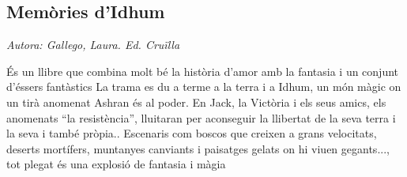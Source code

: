 \begin{news}


\subsection*{Memòries d’Idhum}

\emph{Autora: Gallego, Laura. Ed. Cruïlla}

És un llibre que combina molt bé la història d’amor amb la fantasia i un conjunt d’éssers fantàstics
La trama es du a terme a la terra i a Idhum, un món màgic on un tirà anomenat Ashran és al poder. En Jack, la Victòria i els seus amics, els anomenats “la resistència”,  lluitaran per aconseguir la llibertat de la seva terra i la seva i també pròpia.. Escenaris com boscos que creixen a grans velocitats, deserts mortífers, muntanyes canviants i paisatges gelats on hi viuen gegants..., tot plegat és una explosió de fantasia i màgia

\end{news}
